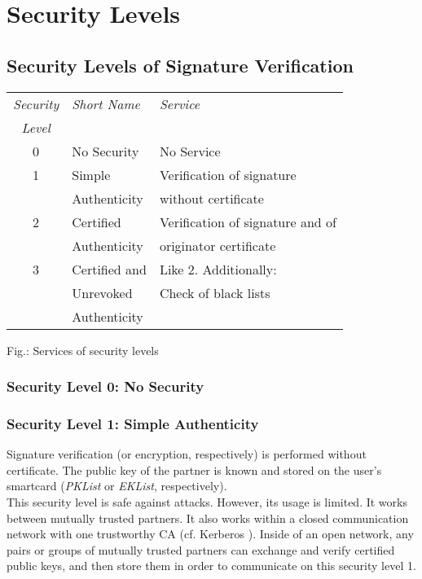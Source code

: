 \section{Security Levels}
\thispagestyle{myheadings}
\label{sl}

\subsection{Security Levels of Signature Verification}
\label{sl-sv}

\begin {center}
\begin {tabular}{|c|l|l|}
\hline
{\em Security} & {\em Short Name} & {\em Service} \\
{\em Level} & & \\ \hline
0 & No Security  & No Service \\ \hline
1 & Simple       & Verification of signature \\
  & Authenticity & without certificate \\ \hline
2 & Certified    & Verification of signature and of \\
  & Authenticity & originator certificate \\ \hline
3 & Certified and& Like 2. Additionally:  \\
  & Unrevoked    & Check of black lists \\
  & Authenticity & \\ \hline
\end {tabular}
\end {center}
 
\label{fig-sl-sv}
{\footnotesize Fig.: Services of security levels}

\subsubsection{Security Level 0: No Security}
\label{sl-sv0}
 
\subsubsection{Security Level 1: Simple Authenticity}
\label{sl-sv1}

Signature verification (or encryption, respectively)
is performed without certificate.
The public key of the partner is known and stored on the user's smartcard
({\em PKList} or {\em EKList}, respectively).
\\[1ex]
This security level is safe against attacks.
However, its usage is limited.
It works between mutually trusted partners.
It also works within
a closed communication network with one trustworthy CA
(cf. Kerberos \cite{ste1}).
Inside of an open network, any pairs or groups of mutually trusted
partners can exchange and verify certified public keys,
and then store them in order to communicate on this security level 1.

